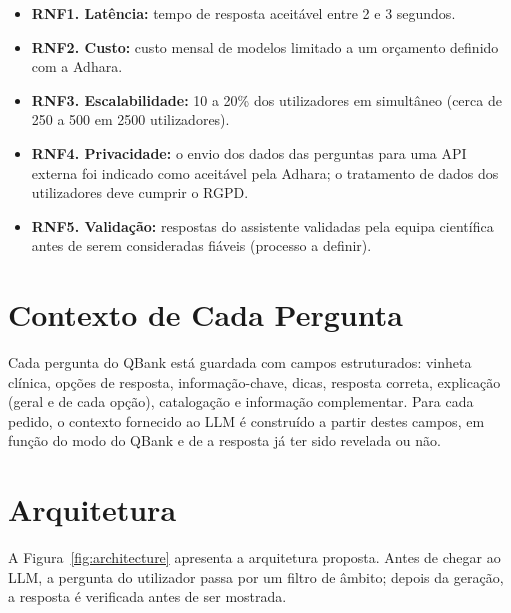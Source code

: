 \begin{itemize}
    \item \textbf{RNF1. Latência:} tempo de resposta aceitável entre 2 e 3 segundos.
    \item \textbf{RNF2. Custo:} custo mensal de modelos limitado a um orçamento definido com a Adhara.
    \item \textbf{RNF3. Escalabilidade:} 10 a 20\% dos utilizadores em simultâneo (cerca de 250 a 500 em 2500 utilizadores). %
    \item \textbf{RNF4. Privacidade:} o envio dos dados das perguntas para uma \gls{API} externa foi indicado como aceitável pela Adhara; o tratamento de dados dos utilizadores deve cumprir o \gls{RGPD}.
    \item \textbf{RNF5. Validação:} respostas do assistente validadas pela equipa científica antes de serem consideradas fiáveis (processo a definir).
\end{itemize}

\section{Contexto de Cada Pergunta}
\label{sec:chap3_context}

Cada pergunta do QBank está guardada com campos estruturados: vinheta clínica, opções de resposta, informação-chave, dicas, resposta correta, explicação (geral e de cada opção), catalogação e informação complementar. Para cada pedido, o contexto fornecido ao \gls{LLM} é construído a partir destes campos, em função do modo do QBank e de a resposta já ter sido revelada ou não.


\section{Arquitetura}
\label{sec:chap3_architecture}

A Figura~\ref{fig:architecture} apresenta a arquitetura proposta. Antes de chegar ao \gls{LLM}, a pergunta do utilizador passa por um filtro de âmbito; depois da geração, a resposta é verificada antes de ser mostrada. %

